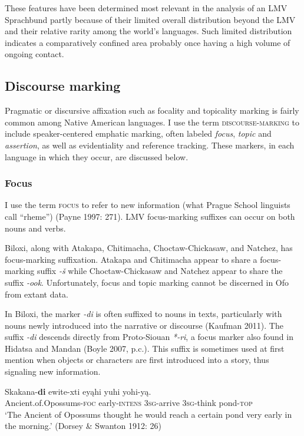 \documentclass[output=paper]{LSP/langsci}
\begin{document}
These features have been determined most relevant in the analysis of an LMV Sprachbund partly because of their limited overall distribution beyond the LMV and their relative rarity among the world’s languages. Such limited distribution indicates a comparatively confined area probably once having a high volume of ongoing contact.

\subsection{Discourse marking}

Pragmatic or discursive affixation such as focality and topicality marking is fairly common among Native American languages. I use the term \textsc{discourse-marking} to include speaker-centered emphatic marking, often labeled \emph{focus}, \emph{topic} and \emph{assertion}, as well as evidentiality and reference tracking. These markers, in each language in which they occur, are discussed below.

\subsubsection{Focus}
	
I use the term \textsc{focus} to refer to new information (what Prague School linguists call “rheme”) (Payne 1997: 271). LMV focus-marking suffixes can occur on both nouns and verbs.

	Biloxi, along with Atakapa, Chitimacha, Choctaw-Chickasaw, and Natchez, has focus-marking suffixation. Atakapa and Chitimacha appear to share a focus-marking suffix \emph{-š} while Choctaw-Chickasaw and Natchez appear to share the suffix \emph{-ook}. Unfortunately, focus and topic marking cannot be discerned in Ofo from extant data.

In Biloxi, the marker \emph{-di} is often suffixed to nouns in texts, particularly with nouns newly introduced into the narrative or discourse (Kaufman 2011). The suffix \emph{-di} descends directly from Proto-Siouan \emph{*-ri}, a focus marker also found in Hidatsa and Mandan (Boyle 2007, p.c.). This suffix is sometimes used at first mention when objects or characters are first introduced into a story, thus signaling new information. 

\ea\label{possumpond}
\gll 	Skakana-\textbf{di} ewite-xti eyąhi yuhi yohi-y\k{a}. \\
	Ancient.of.Opossums-\textsc{foc} early-\textsc{intens} \textsc{3sg}-arrive \textsc{3sg}-think pond-\textsc{top}\\
\glt `The Ancient of Opossums thought he would reach a certain pond very early in the morning.' (Dorsey \& Swanton 1912: 26)
\z
\end{document}
